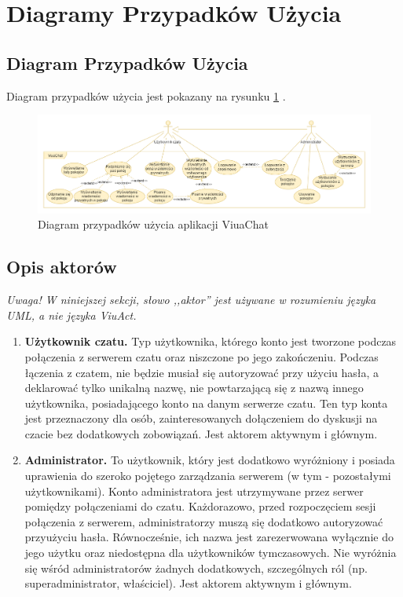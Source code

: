 \section{Diagramy Przypadków Użycia}

\subsection{Diagram Przypadków Użycia}

Diagram przypadków użycia jest pokazany na rysunku \ref{dpu-chat-v2}
.
\begin{figure}[!htp]
	\centering
	\includegraphics[width=\textwidth]{chat/fig/dpu-chat-v2}
	\caption{Diagram przypadków użycia aplikacji ViuaChat}
	\label{dpu-chat-v2}
\end{figure}

\subsection{Opis aktorów}

\textit{Uwaga! W niniejszej sekcji, słowo ,,aktor'' jest używane w rozumieniu
języka UML, a nie języka ViuAct.}

\begin{enumerate}
	\item \textbf{Użytkownik czatu.} Typ użytkownika, którego konto
	jest tworzone podczas połączenia z serwerem czatu oraz niszczone po jego
	zakończeniu. Podczas łączenia z czatem, nie będzie musiał się autoryzować przy
	użyciu hasła, a deklarować tylko unikalną nazwę, nie powtarzającą się z nazwą
	innego użytkownika, posiadającego konto na danym serwerze czatu. Ten typ konta
	jest przeznaczony dla osób, zainteresowanych dołączeniem do dyskusji na czacie
	bez dodatkowych zobowiązań. Jest aktorem aktywnym i głównym.

	\item \textbf{Administrator.} To użytkownik, który jest dodatkowo
	wyróżniony i posiada uprawienia do szeroko pojętego zarządzania serwerem (w
	tym - pozostałymi użytkownikami). Konto administratora jest
	utrzymywane przez serwer pomiędzy połączeniami do czatu. Każdorazowo, przed
	rozpoczęciem sesji połączenia z serwerem, administratorzy muszą się dodatkowo
	autoryzować przyużyciu hasła. Równocześnie, ich nazwa jest zarezerwowana
	wyłącznie do jego	użytku oraz niedostępna	dla użytkowników tymczasowych. Nie
	wyróżnia się wśród administratorów żadnych dodatkowych, szczególnych ról
	(np. superadministrator, właściciel). Jest aktorem aktywnym i głównym.

\end{enumerate}

